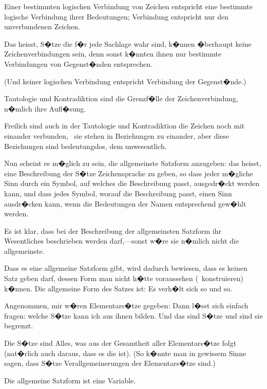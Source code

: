{Einer bestimmten logischen Verbindung von
Zeichen entspricht eine bestimmte logische Verbindung
ihrer Bedeutungen; 
Verbindung entspricht nur den unverbundenen
Zeichen.

Das heisst, S�tze die f�r jede Sachlage wahr
sind, k�nnen �berhaupt keine Zeichenverbindungen
sein, denn sonst k�nnten ihnen nur bestimmte
Verbindungen von Gegenst�nden entsprechen.

(Und keiner logischen Verbindung entspricht
 Verbindung der Gegenst�nde.)

Tautologie und Kontradiktion sind die Grenzf�lle
der Zeichenverbindung, n�mlich ihre Aufl�sung.}


{Freilich sind auch in der Tautologie und Kontradiktion
die Zeichen noch mit einander verbunden,
\dasHeiszt\ sie stehen in Beziehungen zu einander,
aber diese Beziehungen sind bedeutungslos, dem
 unwesentlich.}


{Nun scheint es m�glich zu sein, die allgemeinste
Satzform anzugeben: das heisst, eine Beschreibung
der S�tze  Zeichensprache zu geben,
so dass jeder m�gliche Sinn durch ein Symbol,
auf welches die Beschreibung passt, ausgedr�ckt
werden kann, und dass jedes Symbol, worauf die
Beschreibung passt, einen Sinn ausdr�cken kann,
wenn die Bedeutungen der Namen entsprechend
gew�hlt werden.

Es ist klar, dass bei der Beschreibung der
allgemeinsten Satzform  ihr Wesentliches
beschrieben werden darf,---sonst w�re sie n�mlich
nicht die allgemeinste.

Dass es eine allgemeine Satzform gibt, wird
dadurch bewiesen, dass es keinen Satz geben darf,
dessen Form man nicht h�tte voraussehen (\dasHeiszt\ konstruieren)
k�nnen. Die allgemeine Form des
Satzes ist: Es verh�lt sich so und so.}


{Angenommen, mir w�ren  Elementars�tze
gegeben: Dann l�sst sich einfach fragen: welche
S�tze kann ich aus ihnen bilden. Und das sind
 S�tze und  sind sie begrenzt.}


{Die S�tze sind Alles, was aus der Gesamtheit
aller Elementars�tze folgt (nat�rlich auch daraus,
dass es die  ist). (So k�nnte
man in gewissem Sinne sagen, dass  S�tze
Verallgemeinerungen der Elementars�tze sind.)}


{Die allgemeine Satzform ist eine Variable.}


